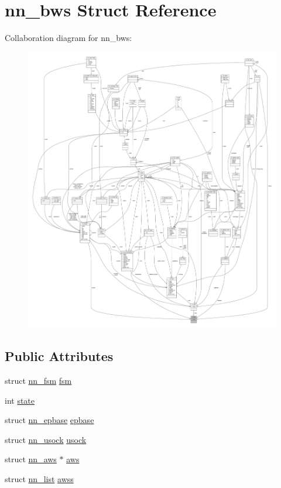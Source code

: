 \hypertarget{structnn__bws}{}\section{nn\+\_\+bws Struct Reference}
\label{structnn__bws}


Collaboration diagram for nn\+\_\+bws\+:\nopagebreak
\begin{figure}[H]
\begin{center}
\leavevmode
\includegraphics[width=350pt]{structnn__bws__coll__graph}
\end{center}
\end{figure}
\subsection*{Public Attributes}
\begin{DoxyCompactItemize}
\item 
struct \hyperlink{structnn__fsm}{nn\+\_\+fsm} \hyperlink{structnn__bws_a9418e42dd701ba439685ffaea8e97a02}{fsm}
\item 
int \hyperlink{structnn__bws_a0102f70d814af99ecedd5c2b0f471a2d}{state}
\item 
struct \hyperlink{structnn__epbase}{nn\+\_\+epbase} \hyperlink{structnn__bws_ad00de0df67ca0663205c45e207e81bfb}{epbase}
\item 
struct \hyperlink{structnn__usock}{nn\+\_\+usock} \hyperlink{structnn__bws_a322ef3f4fe653a4002a8d6355fe48ee5}{usock}
\item 
struct \hyperlink{structnn__aws}{nn\+\_\+aws} $\ast$ \hyperlink{structnn__bws_a718a3274a89d9327c13c956cc9b105a4}{aws}
\item 
struct \hyperlink{structnn__list}{nn\+\_\+list} \hyperlink{structnn__bws_ac1620e662d0c298115bcda10cfe6df91}{awss}
\end{DoxyCompactItemize}


